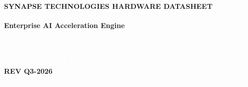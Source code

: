 \documentclass[10pt,a4paper]{article}
\begin{document}
\begin{tcolorbox}[
  colback=Primary,
  colframe=Primary,
  arc=4pt,
  left=10pt,right=10pt,top=10pt,bottom=10pt,
  boxrule=0pt
]
  \begin{minipage}[c]{0.70\textwidth}
    \textcolor{Accent}{\bfseries\scriptsize SYNAPSE TECHNOLOGIES \textbullet{} HARDWARE DATASHEET}\\[2pt]
    \textcolor{white}{\Huge\bfseries Synapse Core-X9}\\[2pt]
    \textcolor{Accent!30}{\large\bfseries Enterprise AI Acceleration Engine}\\[4pt]
    \textcolor{white}{\small High-performance PCIe Gen 5.0 inference engine for real-time edge intelligence and deep learning workloads.}
  \end{minipage}%
  \hfill
  \begin{minipage}[c]{0.26\textwidth}
    \begin{tcolorbox}[
      colback=Primary!80!black,
      colframe=Accent,
      boxrule=0.8pt,
      arc=3pt,
      left=4pt,right=4pt,top=6pt,bottom=6pt,
      halign=center
    ]
      \textcolor{white}{\scriptsize\bfseries STATUS: PRODUCTION}\\[2pt]
      \textcolor{Accent}{\small\bfseries REV Q3-2026}\\[2pt]
      \textcolor{white}{\tiny PART: SYN-X9-64G}
    \end{tcolorbox}
  \end{minipage}
\end{tcolorbox}

\vspace{6pt}
\end{document}
